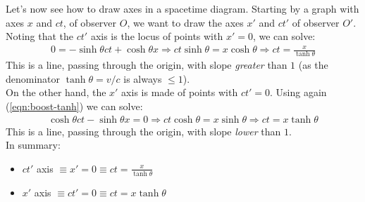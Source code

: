 \documentclass[../template.tex]{subfiles}
\begin{document}
Let's now see how to draw axes in a spacetime diagram. Starting by a graph with axes $x$ and $ct$, of observer $O$, we want to draw the axes $x'$ and $ct'$ of observer $O'$.\\
Noting that the $ct'$ axis is the locus of points with $x'=0$, we can solve:
\begin{align*}
0 = -\sinh \theta ct +\cosh\theta x \Rightarrow ct \sinh\theta = x\cosh\theta \Rightarrow ct =\frac{x}{\tanh\theta}
\end{align*}
This is a line, passing through the origin, with slope \textit{greater} than $1$ (as the denominator $\tanh\theta =v/c$ is always $\leq 1$).\\

On the other hand, the $x'$ axis is made of points with $ct'=0$. Using again (\ref{eqn:boost-tanh}) we can solve:
\begin{align*}
\cosh\theta ct - \sinh\theta x = 0 \Rightarrow ct\cosh\theta = x\sinh\theta \Rightarrow ct = x\tanh\theta
\end{align*}
This is a line, passing through the origin, with slope \textit{lower} than $1$.\\
In summary:
\begin{itemize}
\item $ct'$ axis $\displaystyle\equiv x'=0 \equiv ct =\frac{x}{\tanh\theta}$
\item $x'$ axis $\equiv \displaystyle ct'=0 \equiv ct=x\tanh\theta$
\end{itemize}
\end{document}
